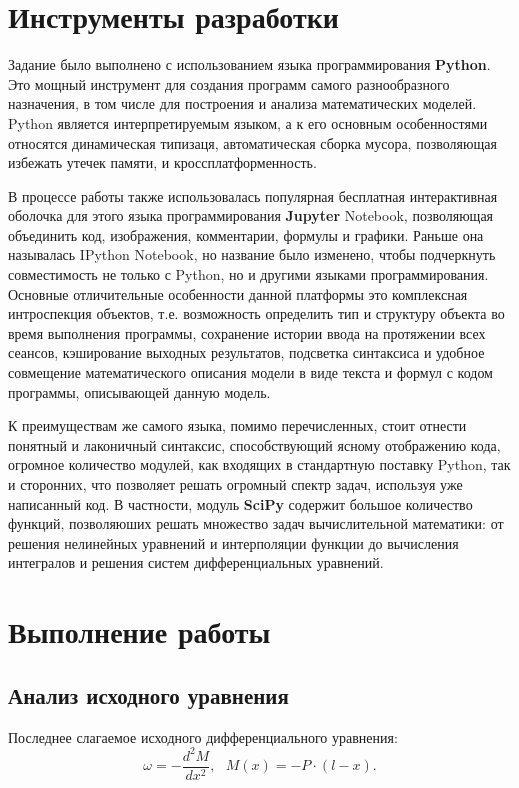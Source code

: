 \section{Инструменты разработки}

Задание было выполнено с использованием языка программирования \textbf{Python}. Это мощный инструмент для создания программ самого разнообразного назначения, в том числе для построения и анализа математических моделей. Python является интерпретируемым языком, а к его основным особенностями относятся динамическая типизаця, автоматическая сборка мусора, позволяющая избежать утечек памяти, и кроссплатформенность. 

В процессе работы также использовалась популярная бесплатная интерактивная оболочка для этого языка программирования \textbf{Jupyter} Notebook, позволяющая объединить код, изображения, комментарии, формулы и графики. Раньше она называлась IPython Notebook, но название было изменено, чтобы подчеркнуть совместимость не только с Python, но и другими языками программирования. Основные отличительные особенности данной платформы  это комплексная интроспекция объектов, т.е. возможность определить тип и структуру объекта во время выполнения программы, сохранение истории ввода на протяжении всех сеансов, кэширование выходных результатов, подсветка синтаксиса и удобное совмещение математического описания модели в виде текста и формул с кодом программы, описывающей данную модель. 

К преимуществам же самого языка, помимо перечисленных, стоит отнести понятный и лаконичный синтаксис, способствующий ясному отображению кода, огромное количество модулей, как входящих в стандартную поставку Python, так и сторонних, что позволяет решать огромный спектр задач, используя уже написанный код. В частности, модуль \textbf{SciPy} содержит большое количество функций, позволяюших решать множество задач вычислительной математики: от решения нелинейных уравнений и интерполяции функции до вычисления интегралов и решения систем дифференциальных уравнений.

\section{Выполнение работы}

\subsection{Анализ исходного уравнения}

Последнее слагаемое исходного дифференциального уравнения:
\[
	\omega = -\frac{d^2M}{dx^2},\ \ \ M(x) = -P \cdot (l - x).
\]

